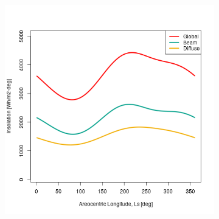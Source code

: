 \begin{figure}[H]
\vspace{-2ex}
	\centering
    \setlength{\subfigureWidth}{0.50\textwidth}
    \setlength{\graphicsHeight}{80mm}
    \hypersetup{hidelinks=true}%
  	\begin{subfigure}[t]{\subfigureWidth}
      \centering
  		\includegraphics[height=\graphicsHeight]{sections/martian-environment/plots/variation-of-global-beam-and-diffuse-insolation-on-mars-horizontal-surface-as-a-function-of-areocentric-longitude-for-tau05-and-phi205.png}
  		\label{fig:sub:insolation-ls-tau-factor-0p5}
  	\end{subfigure}\hfill
    \begin{subfigure}[t]{\subfigureWidth}
      \centering

\end{subfigure}
\end{figure}
